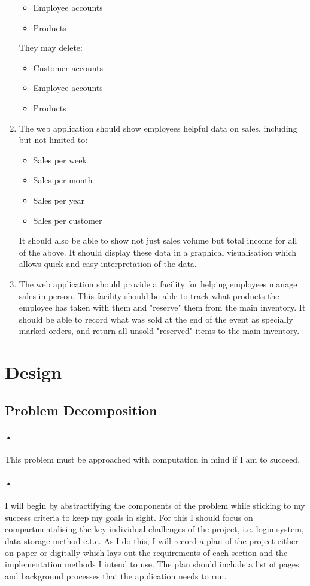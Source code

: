 \documentclass{article}
\begin{document}
\begin{enumerate}
\begin{itemize}
    \item Employee accounts
    \item Products
    \end{itemize}
    They may delete:
    \begin{itemize}
    \item Customer accounts
    \item Employee accounts
    \item Products
    \end{itemize}
    \item The web application should show employees helpful data on sales, including but not limited to:
    \begin{itemize}
    \item Sales per week
    \item Sales per month
    \item Sales per year
    \item Sales per customer
    \end{itemize}
    It should also be able to show not just sales volume but total income for all of the above. It should display these data in a graphical visualisation which allows quick and easy interpretation of the data.
    \item The web application should provide a facility for helping employees manage sales in person.
    This facility should be able to track what products the employee has taken with them and "reserve" them from the main inventory.
    It should be able to record what was sold at the end of the event as specially marked orders, and return all unsold "reserved" items to the main inventory.
    \end{enumerate}
    \newpage
    \section{Design}
    \subsection{Problem Decomposition}
    \paragraph{•}
    This problem must be approached with computation in mind if I am to succeed.
    \paragraph{•}
    I will begin by abstractifying the components of the problem while sticking to my success criteria to keep my goals in sight.
    For this I should focus on compartmentalising the key individual challenges of the project, i.e. login system, data storage method e.t.c.
    As I do this, I will record a plan of the project either on paper or digitally which lays out the requirements of each section and the implementation methods I intend to use.
    The plan should include a list of pages and background processes that the application needs to run.
\end{document}
